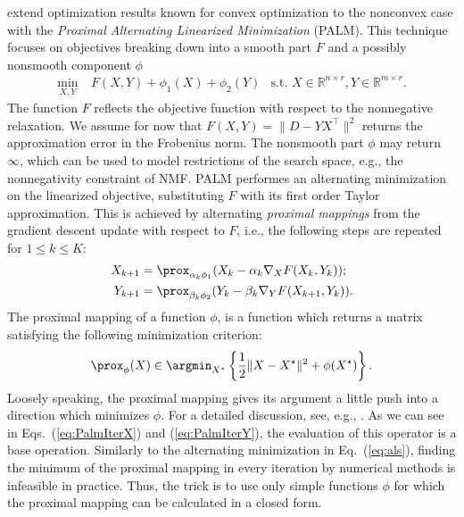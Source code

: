 \cite{bolte2014proximal} extend optimization results known for convex optimization to the nonconvex case with the \emph{Proximal Alternating Linearized Minimization} (PALM). This technique focuses on objectives breaking down into a smooth part $F$ and a possibly nonsmooth component $\phi$
\begin{align}\label{eq:PalmObj}
 \min_{X,Y}&\	F(X,Y)+ \phi_1(X) +\phi_2(Y) &\text{s.t. }X\in\mathbb{R}^{n\times r}, Y\in\mathbb{R}^{m\times r}.
\end{align}
The function $F$ reflects the objective function with respect to the nonnegative relaxation. We assume for now that $F(X,Y)=\|D-YX^\top\|^2$ returns the approximation error in the Frobenius norm. 
The nonsmooth part $\phi$ may return $\infty$, which can be used to model restrictions of the search space, e.g., the nonnegativity constraint of NMF. 
PALM performes an alternating minimization on the linearized objective, substituting $F$ with its first order Taylor approximation. This is achieved by alternating \emph{proximal mappings} from the gradient descent update with respect to $F$, i.e., the following steps are repeated for $1\leq k \leq K$:
\begin{align}\label{eq:PalmIterX}
X_{k+1} &= \prox_{\alpha_k\phi_1}(X_k-\alpha_k\nabla_XF(X_k,Y_k));\\
Y_{k+1} &= \prox_{\beta_k\phi_2}(Y_k-\beta_k\nabla_YF(X_{k+1},Y_k)).\label{eq:PalmIterY}
\end{align}
The proximal mapping of a function $\phi$, is a function which returns a matrix satisfying the following minimization criterion: 
\begin{align}\label{eq:prox}
    \prox_\phi(X) \in \argmin_{X^\star}\left\{\frac{1}{2}\|X-X^\star\|^2+\phi(X^\star)\right\}.
\end{align}
Loosely speaking, the proximal mapping gives its argument a little push into a direction which minimizes $\phi$. For a detailed discussion, see, e.g., \citep{parikh2014proximal}. As we can see in Eqs.~(\ref{eq:PalmIterX}) and (\ref{eq:PalmIterY}), the evaluation of this operator is a base operation. Similarly to the alternating minimization in Eq.~(\ref{eq:als}), finding the minimum of the proximal mapping in every iteration by numerical methods is infeasible in practice. Thus, the trick is to use only simple functions $\phi$ for which the proximal mapping can be calculated in a closed form. 

